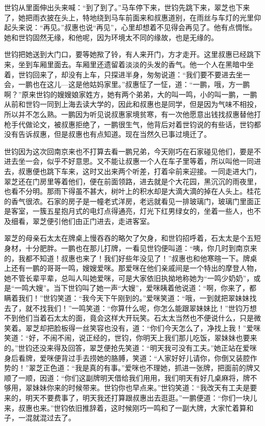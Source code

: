 \par 世钧从里面伸出头来喊：“到了到了。”马车停下来，世钧先跳下来，翠芝也下来了，她把雨衣披在头上，特地绕到马车前面来和叔惠道别，在雨丝与车灯的光里仰起头来说：“再见。”叔惠也说“再见”，心里却想着不见得会再见了。他有点惆怅。她和世钧固然无缘，和他呢，因为环境太不同的缘故，也是无缘的。
\par 世钧把她送到大门口，要等她揿了铃，有人来开门，方才走开。这里叔惠已经跳下来，坐到车厢里面去。车厢里还遗留着淡淡的头发的香气。他一个人在黑暗中坐着，世钧回来了，却没有上车，只探进半身，匆匆说道：“我们要不要进去坐一会，一鹏也在这儿—这是他姑妈家里。”叔惠怔了一怔，道：“一鹏，哦，方一鹏啊？”原来世钧的嫂嫂娘家姓方，她有两个弟弟，大的叫一鸣，小的叫一鹏，一鹏从前和世钧一同到上海去读大学的，因此和叔惠也是同学，但是因为气味不相投，所以并不怎么熟。一鹏因为听见说叔惠家境贫寒，有一次他愿意出钱找叔惠替他打枪手代做论文，被叔惠拒绝了，一鹏很生气，他背后对着世钧说的有些话，世钧都没有告诉叔惠，但是叔惠也有点知道。现在当然久已事过境迁了。
\par 世钧因为这次回南京来也不打算去看一鹏兄弟，今天刚巧在石家碰见他们，要是不进去坐一会，似乎不好意思。又不能让叔惠一个人在车子里等着，所以叫他一同进去，叔惠便也跳下车来，这时又出来两个听差，打着伞前来迎接。一同走进大门，翠芝还在门房里等着他们，便在前面领路，进去就是个大花园，黑沉沉的雨夜里，也看不分明。那雨下得虽不甚大，树叶上的积水却是大滴大滴的掉在人头上。桂花的香气很浓。石家的房子是一幢老式洋房，老远就看见一排玻璃门，玻璃门里面正是客室，一簇五星抱月式的电灯点得通亮，灯光下红男绿女的，坐着一些人，也不及细看，翠芝便引他们由正门进去，走进客室。
\par 翠芝的母亲石太太在牌桌上慢吞吞的略欠了欠身，和世钧招呼着，石太太是个五短身材，十分肥胖。一鹏也在那儿打牌，一看见世钧便叫道：“咦，你几时到南京来的，我都不知道！叔惠也来了！我们好些年没见了！”叔惠也和他寒暄一下。牌桌上还有一鹏的哥哥一鸣，嫂嫂爱咪。那爱咪在他们亲戚间是一个特出的摩登人物，她不管长辈平辈，总叫人叫她爱咪，可是大家依旧执拗地称她为“一鸣少奶奶”，或是“一鸣大嫂”。当下世钧叫了她一声“大嫂”，爱咪眱着他说道：“啊，你来了，都瞒着我们！”世钧笑道：“我今天下午刚到的。”爱咪笑道：“哦，一到就把翠妹妹找去了，就不找我们！”一鸣笑道：“你算什么呢，你怎么能跟翠妹妹比！”世钧万想不到他们当着石太太的面，竟会这样大开玩笑。石太太当然也不便说什么，只是微笑着。翠芝却把脸板得一丝笑容也没有，道：“你们今天怎么了，净找上我！”爱咪笑道：“好，不闹不闹，说正经的，世钧，你明天上我们那儿吃饭，翠妹妹也要来的。”世钧还没来得及回答，翠芝便抢先笑道：“明天我可没有工夫。”她正站在爱咪身后看牌，爱咪便背过手去捞她的胳膊，笑道：“人家好好儿请你，你倒又装腔作势的！”翠芝正色道：“我是真的有事。”爱咪也不理她，抓进一张牌，把面前的牌又顺了一顺，因道：“你们这副牌明天借给我们用用，我们明天有好几桌麻将，牌不够用，翠妹妹你来的时候带来。世钧你也早点来。”世钧笑道：“我改天有工夫是要来的，明天不要费事了，明天我还打算跟叔惠出去逛逛。”一鹏便道：“你们一块儿来，叔惠也来。”世钧依旧推辞着，这时候刚巧一鸣和了一副大牌，大家忙着算和子，一混就混过去了。
